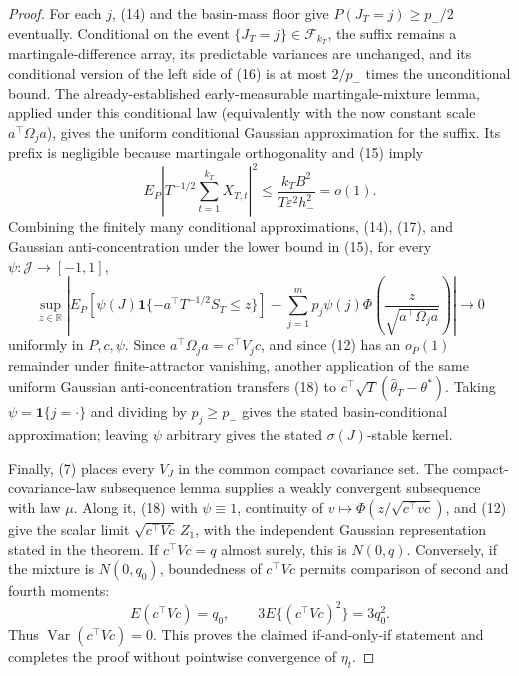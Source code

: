 \documentclass{article}
\begin{document}
\begin{proof}
For each \(j\), (14) and the basin-mass floor give \(P(J_T=j)\ge p_-/2\) eventually.  Conditional on the event \(\{J_T=j\}\in\mathcal F_{k_T}\), the suffix remains a martingale-difference array, its predictable variances are unchanged, and its conditional version of the left side of (16) is at most \(2/p_-\) times the unconditional bound.  The already-established early-measurable martingale-mixture lemma, applied under this conditional law (equivalently with the now constant scale \(a^\top\Omega_ja\)), gives the uniform conditional Gaussian approximation for the suffix.  Its prefix is negligible because martingale orthogonality and (15) imply
\[
 E_P\left|T^{-1/2}\sum_{t=1}^{k_T}X_{T,t}\right|^2
 \le \frac{k_TB^2}{T\varepsilon^2h_-^2}=o(1).                            \tag{17}
\]
Combining the finitely many conditional approximations, (14), (17), and Gaussian anti-concentration under the lower bound in (15), for every \(\psi:\mathcal J\to[-1,1]\),
\[
 \sup_{z\in\mathbb R}\left|
 E_P\!\left[\psi(J)\mathbf1\{-a^\top T^{-1/2}S_T\le z\}\right]
 -\sum_{j=1}^mp_j\psi(j)\Phi\!\left(\frac{z}{\sqrt{a^\top\Omega_ja}}\right)
 \right|\longrightarrow0                                                \tag{18}
\]
uniformly in \(P,c,\psi\).  Since \(a^\top\Omega_ja=c^\top V_jc\), and since (12) has an \(o_P(1)\) remainder under finite-attractor vanishing, another application of the same uniform Gaussian anti-concentration transfers (18) to \(c^\top\sqrt T(\widehat\theta_T-\theta^*)\).  Taking \(\psi=\mathbf1\{j=\cdot\}\) and dividing by \(p_j\ge p_-\) gives the stated basin-conditional approximation; leaving \(\psi\) arbitrary gives the stated \(\sigma(J)\)-stable kernel.

Finally, (7) places every \(V_J\) in the common compact covariance set.  The compact-covariance-law subsequence lemma supplies a weakly convergent subsequence with law \(\mu\).  Along it, (18) with \(\psi\equiv1\), continuity of \(v\mapsto\Phi(z/\sqrt{c^\top vc})\), and (12) give the scalar limit \(\sqrt{c^\top Vc}\,Z_1\), with the independent Gaussian representation stated in the theorem.  If \(c^\top Vc=q\) almost surely, this is \(N(0,q)\).  Conversely, if the mixture is \(N(0,q_0)\), boundedness of \(c^\top Vc\) permits comparison of second and fourth moments:
\[
 E(c^\top Vc)=q_0,
 \qquad
 3E\{(c^\top Vc)^2\}=3q_0^2.
\]
Thus \(\operatorname{Var}(c^\top Vc)=0\).  This proves the claimed if-and-only-if statement and completes the proof without pointwise convergence of \(\eta_t\).
\end{proof}
\end{document}

